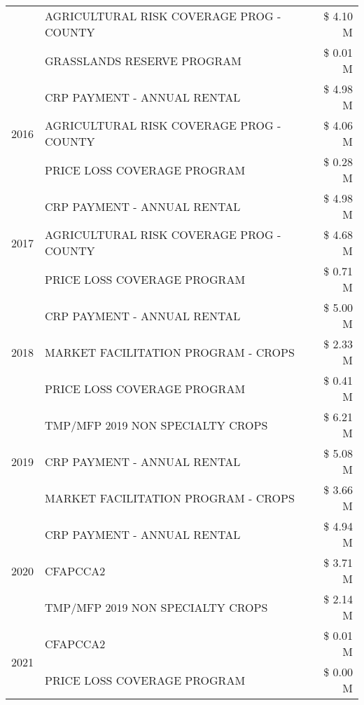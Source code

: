 \begin{tabular}{llr}
 & AGRICULTURAL RISK COVERAGE PROG - COUNTY & \$ 4.10 M \\
 & GRASSLANDS RESERVE PROGRAM & \$ 0.01 M \\
\cline{1-3}
\multirow[t]{3}{*}{2016} & CRP PAYMENT - ANNUAL RENTAL & \$ 4.98 M \\
 & AGRICULTURAL RISK COVERAGE PROG - COUNTY & \$ 4.06 M \\
 & PRICE LOSS COVERAGE PROGRAM & \$ 0.28 M \\
\cline{1-3}
\multirow[t]{3}{*}{2017} & CRP PAYMENT - ANNUAL RENTAL & \$ 4.98 M \\
 & AGRICULTURAL RISK COVERAGE PROG - COUNTY & \$ 4.68 M \\
 & PRICE LOSS COVERAGE PROGRAM & \$ 0.71 M \\
\cline{1-3}
\multirow[t]{3}{*}{2018} & CRP PAYMENT - ANNUAL RENTAL & \$ 5.00 M \\
 & MARKET FACILITATION PROGRAM - CROPS & \$ 2.33 M \\
 & PRICE LOSS COVERAGE PROGRAM & \$ 0.41 M \\
\cline{1-3}
\multirow[t]{3}{*}{2019} & TMP/MFP 2019 NON SPECIALTY CROPS & \$ 6.21 M \\
 & CRP PAYMENT - ANNUAL RENTAL & \$ 5.08 M \\
 & MARKET FACILITATION PROGRAM - CROPS & \$ 3.66 M \\
\cline{1-3}
\multirow[t]{3}{*}{2020} & CRP PAYMENT - ANNUAL RENTAL & \$ 4.94 M \\
 & CFAPCCA2 & \$ 3.71 M \\
 & TMP/MFP 2019 NON SPECIALTY CROPS & \$ 2.14 M \\
\cline{1-3}
\multirow[t]{2}{*}{2021} & CFAPCCA2 & \$ 0.01 M \\
 & PRICE LOSS COVERAGE PROGRAM & \$ 0.00 M \\
\cline{1-3}
\bottomrule
\end{tabular}
